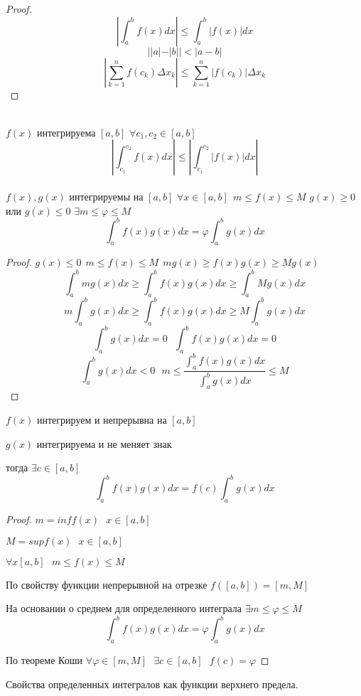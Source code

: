 \begin{proof}
  \[\left| \int_a^b f(x)dx \right| \le \int_a^b |f(x)|dx\]
  \[||a| - |b|| < |a - b|\]
  \[
      \left| \sum_{k=1}^n f(c_k)\Delta x_k \right| \le
      \sum_{k=1}^{n}|f(c_k)|\Delta x_k
  \]
\end{proof}
\\
$f(x)$ интегрируема $[a, b]$ $\forall c_1, c_2 \in [a, b]$
\[
    \left| \int_{c_1}^{c_2} f(x)dx \right| \le
    \left| \int_{c_1}^{c_2} |f(x)|dx \right|
\]
\\
$f(x), g(x)$ интегрируемы на $[a, b]$ $\forall x \in [a, b] ~~
m \le f(x) \le M$ $g(x) \ge 0$ или $g(x) \le 0$ $\exists m \le \varphi \le M$
\[\int_a^b f(x)g(x)dx = \varphi \int_a^b g(x)dx\]
\begin{proof}
    $g(x) \le 0 ~~ m \le f(x) \le M ~~ mg(x) \ge f(x)g(x) \ge Mg(x)$
    \[\int_a^b mg(x)dx \ge \int_a^b f(x)g(x)dx \ge \int_a^b Mg(x)dx\]
    \[m\int_a^b g(x)dx \ge \int_a^b f(x)g(x)dx \ge M\int_a^b g(x)dx\]
    \[\int_a^b g(x)dx = 0 ~~~ \int_a^b f(x)g(x)dx = 0\]
    \[
    \int_a^b g(x)dx < 0 ~~~
    m \le \frac{\int_a^b f(x)g(x)dx}{\int_a^b g(x)dx} \le M
    \]
\end{proof}

\begin{theorem}
  $f(x)$ интегрируем и непрерывна на $[a,b]$

  $g(x)$ интегрируема и не меняет знак

  тогда $\exists c \in [a,b]$
  \[\int_a^b f(x)g(x)dx  = f(c) \int_a^b g(x)dx\]
\end{theorem}

\begin{proof}
  $m = inf f(x) ~~~ x \in [a,b]$

  $M = sup f(x) ~~~ x \in [a,b]$

  $\forall x [a,b] ~~~ m \le f(x) \le M$

  По свойству функции непрерывной на отрезке $f([a,b]) = [m, M]$

  На основании о среднем для определенного интеграла
  $\exists m \le \varphi \le M$
  $$
  \int_a^b f(x)g(x) dx = \varphi \int_a^b g(x) dx
  $$

  По теореме Коши $\forall \varphi \in [m,M] ~~~ \exists c \in [a,b] ~~~ f(c) =
  \varphi$
\end{proof}

\begin{title}[\Large]
  Свойства определенных интегралов как функции верхнего предела.
\end{title}


